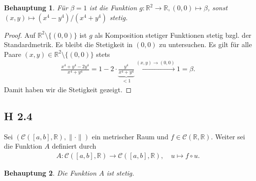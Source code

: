 \documentclass[draft,a5paper]{article}
\newtheorem*{beh}{Behauptung}
\begin{document}
\begin{beh}
  Für \(\beta = 1\) ist die Funktion \(g\colon \mathbb{R}^{2} \to \mathbb{R}, (0, 0) \mapsto  \beta\), sonst
  \((x, y) \mapsto  (x^{4} - y^{4})/(x^{4} + y^{4})\) stetig.
\end{beh}

\begin{proof}
  Auf \(\mathbb{R}^{2} \setminus \{(0, 0)\}\) ist \(g\) als Komposition stetiger
  Funktionen stetig bzgl. der Standardmetrik.  Es bleibt die
  Stetigkeit in \((0, 0)\) zu untersuchen.  Es gilt für alle Paare
  \((x, y) \in \mathbb{R}^{2} \setminus \{(0, 0)\}\) stets
  \begin{align*}
    \frac{x^{4} + y^{4} - 2y^{4}}{x^{4} + y^{4}} = 1 - 2 \cdot
    \underbrace{\frac{y^{4}}{x^{4}+y^{4}}}_{< 1} \stackrel{(x, y) \to
    (0, 0)}{\to} 1 = \beta.
  \end{align*}
  Damit haben wir die Stetigkeit gezeigt.
\end{proof}

\newpage
\subsection*{H 2.4}
Sei \((\mathcal{C} ([a, b], \mathbb{R}), \|\cdot\|)\) ein metrischer Raum und
\(f \in \mathcal{C} (\mathbb{R}, \mathbb{R}) \).  Weiter sei die Funktion \(A\) definiert durch
  \begin{align*}
    A\colon \mathcal{C} ([a, b], \mathbb{R}) \to \mathcal{C} ([a, b], \mathbb{R}), \quad u \mapsto f \circ u.
  \end{align*}

\begin{beh}
  Die Funktion \(A\) ist stetig.
\end{beh}
\end{document}
